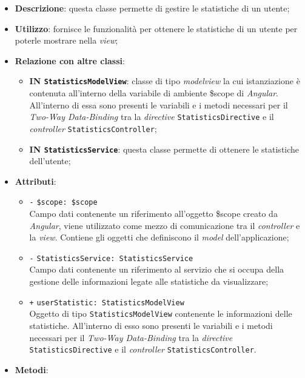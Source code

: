 \begin{itemize}
	\item \textbf{Descrizione}: questa classe permette di gestire le statistiche di un utente;
	\item \textbf{Utilizzo}: fornisce le funzionalità per ottenere le statistiche di un utente per poterle mostrare nella \textit{view};
	\item \textbf{Relazione con altre classi}:
	\begin{itemize}
		\item \textbf{IN \texttt{StatisticsModelView}}: classe di tipo \textit{modelview} la cui istanziazione è contenuta all'interno della variabile di ambiente \$scope di \textit{Angular}. All'interno di essa sono presenti le variabili e i metodi necessari per il \textit{Two-Way Data-Binding} tra la \textit{directive} \texttt{StatisticsDirective} e il \textit{controller} \texttt{StatisticsController}; 
		\item \textbf{IN \texttt{StatisticsService}}: questa classe permette di ottenere le statistiche dell'utente;
	\end{itemize}
	\item \textbf{Attributi}:
	\begin{itemize}
		\item \texttt{-} \texttt{\$scope: \$scope} \\
		Campo dati contenente un riferimento all'oggetto \$scope creato da \textit{Angular}, viene utilizzato come mezzo di comunicazione tra il \textit{controller} e la \textit{view}. Contiene gli oggetti che definiscono il \textit{model} dell'applicazione;
		\item \texttt{-} \texttt{StatisticsService: StatisticsService} \\
		Campo dati contenente un riferimento al servizio che si occupa della gestione delle informazioni legate alle statistiche da visualizzare;
		\item \texttt{+} \texttt{userStatistic: StatisticsModelView} \\ Oggetto di tipo \texttt{StatisticsModelView} contenente le informazioni delle statistiche. All'interno di esso sono presenti le variabili e i metodi necessari per il \textit{Two-Way Data-Binding} tra la \textit{directive} \texttt{StatisticsDirective} e il \textit{controller} \texttt{StatisticsController}.
	\end{itemize}	
	\item \textbf{Metodi}:

\end{itemize}
